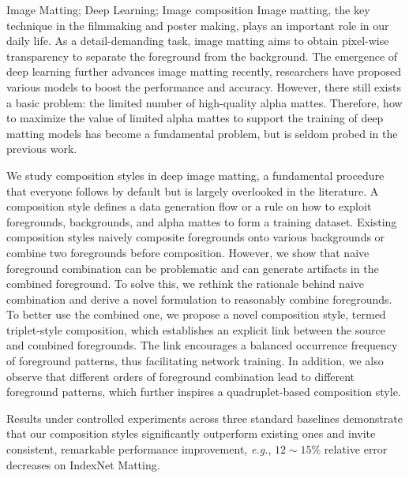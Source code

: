 \documentclass[supercite]{HustGraduPaper}
\begin{document}
	\begin{enabstract}{Image Matting; Deep Learning; Image composition}
		Image matting, the key technique in the filmmaking and poster making, plays an important role in our daily life.  As a detail-demanding task, image matting aims to obtain pixel-wise transparency to separate the foreground from the background.  The emergence of deep learning further advances image matting recently, researchers have proposed various models to boost the performance and accuracy. However, there still exists a basic problem: the limited number of high-quality alpha mattes.  Therefore, how to maximize the value of limited alpha mattes to support the training of deep matting models has become a fundamental problem, but is seldom probed in the previous work.


		We study composition styles in deep image matting, a fundamental procedure that everyone follows by default but is largely overlooked in the literature. A composition style defines a data generation flow or a rule on how to exploit foregrounds, backgrounds, and alpha mattes to form a training dataset. Existing composition styles naively composite foregrounds onto various backgrounds or combine two foregrounds before composition. However, we show that naive foreground combination can be problematic and can generate artifacts in the combined foreground. To solve this, we rethink the rationale behind naive combination and derive a novel formulation to reasonably combine foregrounds. To better use the combined one, we propose a novel composition style, termed triplet-style composition, which establishes an explicit link between the source and combined foregrounds. The link encourages a balanced occurrence frequency of foreground patterns, thus facilitating network training. In addition, we also observe that different orders of foreground combination lead to different foreground patterns, which further inspires a quadruplet-based composition style. 


		Results under controlled experiments across three standard baselines demonstrate that our composition styles significantly outperform existing ones and invite consistent, remarkable performance improvement, \textit{e.g.}, $12\sim15\%$ relative error decreases on IndexNet Matting.\\
	\end{enabstract}
	
\end{document}
